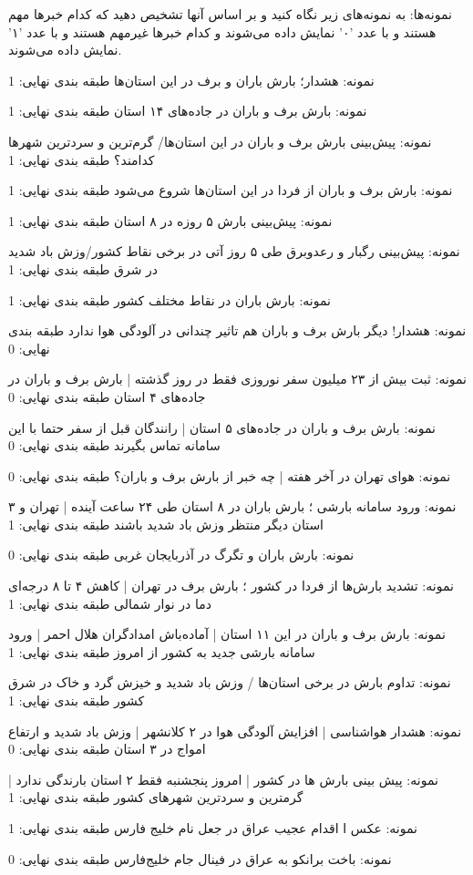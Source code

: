 \vspace{5pt}
\begin{scriptsize}
\begin{itshape}
نمونه‌ها: به نمونه‌های زیر نگاه کنید و بر اساس آنها تشخیص دهید که کدام خبرها مهم هستند و با عدد '۰' نمایش داده می‌شوند و کدام خبرها غیرمهم هستند و با عدد '۱' نمایش داده می‌شوند.
\vspace{3pt}

نمونه: هشدار؛ بارش باران و برف در این استان‌ها طبقه بندی نهایی: 1

نمونه: بارش برف و باران در جاده‌های ۱۴ استان طبقه بندی نهایی: 1

نمونه: پیش‌بینی بارش برف و باران در این استان‌ها/ گرم‌ترین و سردترین شهرها کدامند؟ طبقه بندی نهایی: 1

نمونه: بارش برف و باران از فردا در این استان‌ها شروع می‌شود طبقه بندی نهایی: 1

نمونه: پیش‌بینی بارش ۵ روزه در ۸ استان طبقه بندی نهایی: 1

نمونه: پیش‌بینی رگبار و رعدوبرق طی ۵ روز آتی در برخی نقاط کشور/وزش باد شدید در شرق طبقه بندی نهایی: 1

نمونه: بارش باران در نقاط مختلف کشور طبقه بندی نهایی: 1

نمونه: هشدار! دیگر بارش برف و باران هم تاثیر چندانی در آلودگی هوا ندارد طبقه بندی نهایی: 0

نمونه: ثبت بیش از ۲۳ میلیون سفر نوروزی فقط در روز گذشته | بارش برف و باران در جاده‌های ۴ استان طبقه بندی نهایی: 0

نمونه: بارش برف و باران در جاده‌های ۵ استان | رانندگان قبل از سفر حتما با این سامانه تماس بگیرند طبقه بندی نهایی: 0

نمونه: هوای تهران در آخر هفته | چه خبر از بارش برف و باران؟ طبقه بندی نهایی: 0

نمونه: ورود سامانه بارشی ؛ بارش باران در ۸ استان طی ۲۴ ساعت آینده | تهران و ۳ استان دیگر منتظر وزش باد شدید باشند طبقه بندی نهایی: 1

نمونه: بارش باران و تگرگ در آذربایجان غربی طبقه بندی نهایی: 0

نمونه: تشدید بارش‌ها از فردا در کشور ؛ بارش برف در تهران | کاهش ۴ تا ۸ درجه‌ای دما در نوار شمالی طبقه بندی نهایی: 1

نمونه: بارش برف و باران در این ۱۱ استان | آماده‌باش امدادگران هلال احمر | ورود سامانه بارشی جدید به کشور از امروز طبقه بندی نهایی: 1

نمونه: تداوم بارش در برخی استان‌ها / وزش باد شدید و خیزش گرد و خاک در شرق کشور طبقه بندی نهایی: 1

نمونه: هشدار هواشناسی | افزایش آلودگی هوا در ۲ کلانشهر | وزش باد شدید و ارتفاع امواج در ۳ استان طبقه بندی نهایی: 0

نمونه: پیش بینی بارش ها در کشور | امروز پنجشنبه فقط ۲ استان بارندگی ندارد |  گرمترین و سردترین شهرهای کشور طبقه بندی نهایی: 1

نمونه: عکس ا اقدام عجیب عراق در جعل نام خلیج فارس طبقه بندی نهایی: 1

نمونه: باخت برانکو به عراق در فینال جام خلیج‌فارس طبقه بندی نهایی: 0

\end{itshape}
\end{scriptsize}
\vspace{5pt}


